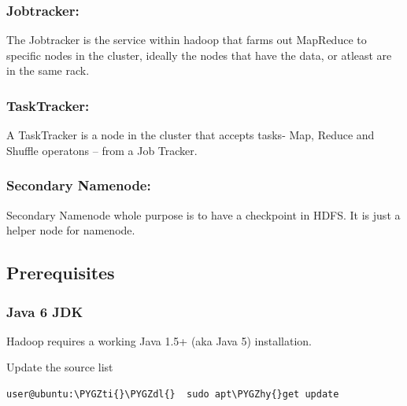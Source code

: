 \documentclass[letterpaper,10pt,english]{sphinxmanual}
\def\PYGZdl{\char`\$}
\def\PYGZhy{\char`\-}
\def\PYGZti{\char`\~}
\begin{document}
\subsubsection{Jobtracker:}
\label{hadoop:jobtracker}
The Jobtracker is the service within hadoop that farms out MapReduce to specific nodes in the cluster, ideally the nodes that have the data, or atleast are in the same rack.


\subsubsection{TaskTracker:}
\label{hadoop:tasktracker}
A TaskTracker is a node in the cluster that accepts tasks- Map, Reduce and Shuffle operatons – from a Job Tracker.


\subsubsection{Secondary Namenode:}
\label{hadoop:secondary-namenode}
Secondary Namenode whole purpose is to have a checkpoint in HDFS. It is just a helper node for namenode.


\subsection{Prerequisites}
\label{hadoop:prerequisites}

\subsubsection{Java 6 JDK}
\label{hadoop:java-6-jdk}
Hadoop requires a working Java 1.5+ (aka Java 5) installation.

Update the source list

\begin{Verbatim}[commandchars=\\\{\}]
user@ubuntu:\PYGZti{}\PYGZdl{}  sudo apt\PYGZhy{}get update
\end{Verbatim}
\begin{figure}[htbp]
\centering

\end{figure}
\end{document}
